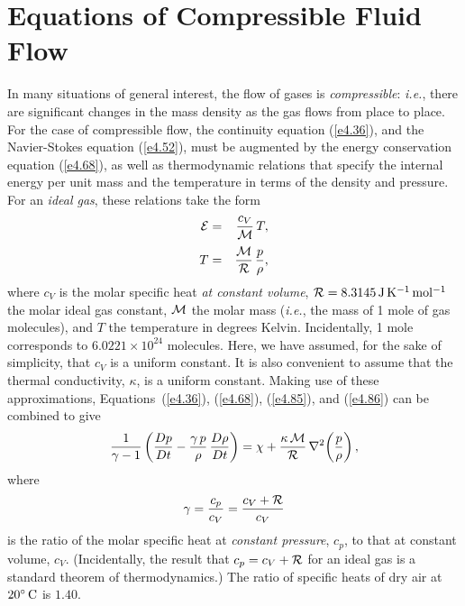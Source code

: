 \section{Equations of Compressible Fluid Flow}
In many situations of general interest, the flow of gases is {\em compressible}: {\em i.e.}, there are significant changes in the
mass density  as the gas flows from place to place. For the case of compressible flow, the continuity equation 
(\ref{e4.36}), and the Navier-Stokes equation (\ref{e4.52}), must be augmented by the energy
conservation equation (\ref{e4.68}), as well as thermodynamic relations that specify the internal
energy per unit mass  and the temperature in terms of the density and pressure.
For an {\em ideal gas}, these relations take the form
\begin{eqnarray}\label{e4.85}
{\cal E} &=& \frac{c_V}{\cal M}\,T,\\[0.5ex]
T&=& \frac{\cal M}{\cal R}\,\frac{p}{\rho},\label{e4.86}
\end{eqnarray}
where $c_V$ is the molar specific heat  {\em at constant volume}, ${\cal R}=8.3145\,{\rm J\,K^{-1}\,mol^{-1}}$ 
the molar ideal gas constant, ${\cal M}$ the molar mass ({\em i.e.}, the mass of 1 mole of gas molecules), and $T$  the temperature in degrees Kelvin. Incidentally, 1 mole corresponds to $6.0221\times 10^{24}$ molecules. Here, we have assumed, for the sake of simplicity, that $c_V$ is a  uniform constant. 
It is also convenient to  assume that the  thermal conductivity, $\kappa$, is a
 uniform constant. Making use of these approximations, Equations~(\ref{e4.36}), (\ref{e4.68}), (\ref{e4.85}), and (\ref{e4.86}) can be
combined to give
\begin{equation}
\frac{1}{\gamma-1}\left(\frac{Dp}{Dt} - \frac{\gamma\,p}{\rho}\,\frac{D\rho}{Dt}\right)
= \chi + \frac{\kappa\,{\cal M}}{\cal R}\,\nabla^2\!\left(\frac{p}{\rho}\right),
\end{equation}
where 
\begin{equation}
\gamma = \frac{c_p}{c_V} = \frac{c_V+{\cal R}}{c_V}
\end{equation}
is the ratio of the molar specific heat at {\em constant pressure}, $c_p$,  to that at constant volume, $c_V$. (Incidentally, the result that $c_p=c_V+{\cal R}$
for an ideal gas is a standard theorem of thermodynamics.) The ratio of specific heats of dry air
at $20^\circ\,{\rm C}$ is $1.40$. 

